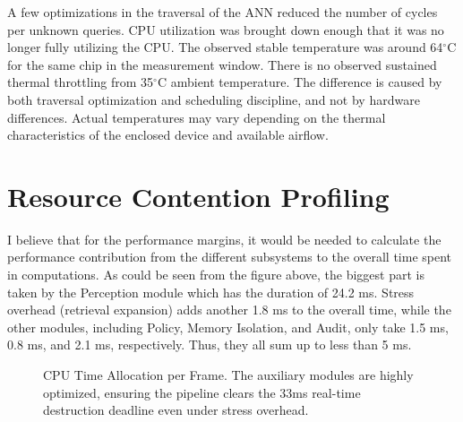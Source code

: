 \documentclass[conference]{IEEEtran}
\begin{document}
A few optimizations in the traversal of the ANN reduced the number of cycles per unknown queries. CPU utilization was brought down enough that it was no longer fully utilizing the CPU. The observed stable temperature was around 64$^\circ\text{C}$ for the same chip in the measurement window. There is no observed sustained thermal throttling from 35$^\circ\text{C}$ ambient temperature. The difference is caused by both traversal optimization and scheduling discipline, and not by hardware differences. Actual temperatures may vary depending on the thermal characteristics of the enclosed device and available airflow.

\section{Resource Contention Profiling}

I believe that for the performance margins, it would be needed to calculate the performance contribution from the different subsystems to the overall time spent in computations. As could be seen from the figure above, the biggest part is taken by the Perception module which has the duration of 24.2 ms. Stress overhead (retrieval expansion) adds another 1.8 ms to the overall time, while the other modules, including Policy, Memory Isolation, and Audit, only take 1.5 ms, 0.8 ms, and 2.1 ms, respectively. Thus, they all sum up to less than 5 ms.

\begin{figure}[htbp]
\centering
{}
\caption{CPU Time Allocation per Frame. The auxiliary modules are highly optimized, ensuring the pipeline clears the 33ms real-time destruction deadline even under stress overhead.}
\label{fig:resource}
\end{figure}
\end{document}

